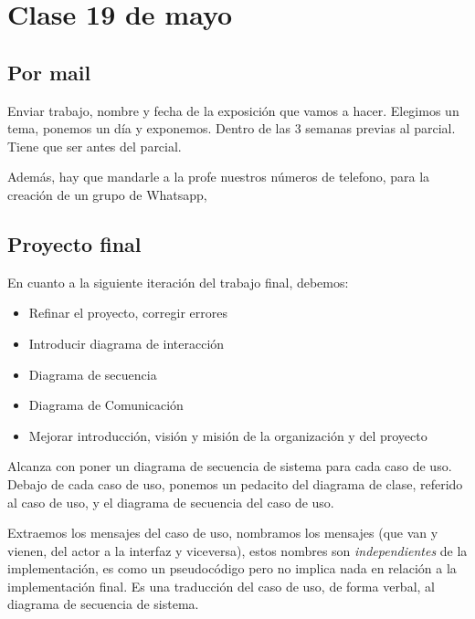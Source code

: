 \section{Clase 19 de mayo}

\subsection{Por mail}

Enviar trabajo, nombre y fecha de la exposición que vamos a hacer.
Elegimos un tema, ponemos un día y exponemos.
Dentro de las 3 semanas previas al parcial.
Tiene que ser antes del parcial.

Además,
hay que mandarle a la profe nuestros números de telefono,
para la creación de un grupo de Whatsapp,

\subsection{Proyecto final}

En cuanto a la siguiente iteración del trabajo final,
debemos:
\begin{itemize}
    \item Refinar el proyecto, corregir errores
    \item Introducir diagrama de interacción
    \item Diagrama de secuencia
    \item Diagrama de Comunicación
    \item Mejorar introducción, visión y misión de la organización y del proyecto 
\end{itemize}

Alcanza con poner un diagrama de secuencia de sistema para cada caso de uso.
Debajo de cada caso de uso,
ponemos un pedacito del diagrama de clase,
referido al caso de uso,
y el diagrama de secuencia del caso de uso.

Extraemos los mensajes del caso de uso,
nombramos los mensajes (que van y vienen, del actor a la interfaz y viceversa),
estos nombres son \textit{independientes} de la implementación,
es como un pseudocódigo pero no implica nada en relación a la implementación final.
Es una traducción del caso de uso,
de forma verbal,
al diagrama de secuencia de sistema.
